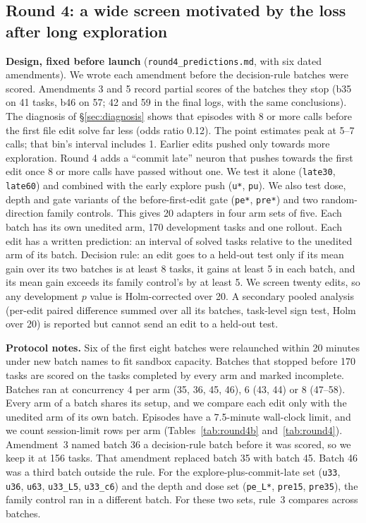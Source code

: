 \subsection{Round 4: a wide screen motivated by the loss after long exploration}
\label{app:round4}
\textbf{Design, fixed before launch} (\texttt{round4\_predictions.md}, with six dated amendments). We wrote each amendment before the decision-rule batches were scored. Amendments 3 and 5 record partial scores of the batches they stop (b35 on 41 tasks, b46 on 57; 42 and 59 in the final logs, with the same conclusions). The diagnosis of \S\ref{sec:diagnosis} shows that episodes with 8 or more calls before the first file edit solve far less (odds ratio 0.12). The point estimates peak at 5--7 calls; that bin's interval includes 1. Earlier edits pushed only towards more exploration. Round 4 adds a ``commit late'' neuron that pushes towards the first edit once 8 or more calls have passed without one. We test it alone (\texttt{late30}, \texttt{late60}) and combined with the early explore push (\texttt{u*}, \texttt{pu}). We also test dose, depth and gate variants of the before-first-edit gate (\texttt{pe*}, \texttt{pre*}) and two random-direction family controls. This gives 20 adapters in four arm sets of five. Each batch has its own unedited arm, 170 development tasks and one rollout. Each edit has a written prediction: an interval of solved tasks relative to the unedited arm of its batch. Decision rule: an edit goes to a held-out test only if its mean gain over its two batches is at least 8 tasks, it gains at least 5 in each batch, and its mean gain exceeds its family control's by at least 5. We screen twenty edits, so any development $p$ value is Holm-corrected over 20. A secondary pooled analysis (per-edit paired difference summed over all its batches, task-level sign test, Holm over 20) is reported but cannot send an edit to a held-out test.

\textbf{Protocol notes.} Six of the first eight batches were relaunched within 20 minutes under new batch names to fit sandbox capacity. Batches that stopped before 170 tasks are scored on the tasks completed by every arm and marked incomplete. Batches ran at concurrency 4 per arm (35, 36, 45, 46), 6 (43, 44) or 8 (47--58). Every arm of a batch shares its setup, and we compare each edit only with the unedited arm of its own batch. Episodes have a 7.5-minute wall-clock limit, and we count session-limit rows per arm (Tables~\ref{tab:round4b} and~\ref{tab:round4}). Amendment~3 named batch 36 a decision-rule batch before it was scored, so we keep it at 156 tasks. That amendment replaced batch 35 with batch 45. Batch 46 was a third batch outside the rule. For the explore-plus-commit-late set (\texttt{u33}, \texttt{u36}, \texttt{u63}, \texttt{u33\_L5}, \texttt{u33\_c6}) and the depth and dose set (\texttt{pe\_L*}, \texttt{pre15}, \texttt{pre35}), the family control ran in a different batch. For these two sets, rule~3 compares across batches.

